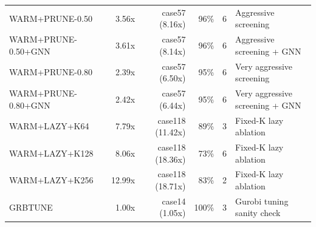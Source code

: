 \begin{table}[t]
{\begin{tabularx}{\linewidth}{|l|r|r|r|r|X|}
WARM+PRUNE-0.50 & 3.56x & case57 (8.16x) & 96\% & 6 & Aggressive screening \\
WARM+PRUNE-0.50+GNN & 3.61x & case57 (8.14x) & 96\% & 6 & Aggressive screening + GNN \\
WARM+PRUNE-0.80 & 2.39x & case57 (6.50x) & 95\% & 6 & Very aggressive screening \\
WARM+PRUNE-0.80+GNN & 2.42x & case57 (6.44x) & 95\% & 6 & Very aggressive screening + GNN \\
WARM+LAZY+K64 & 7.79x & case118 (11.42x) & 89\% & 3 & Fixed-K lazy ablation \\
WARM+LAZY+K128 & 8.06x & case118 (18.36x) & 73\% & 6 & Fixed-K lazy ablation \\
WARM+LAZY+K256 & 12.99x & case118 (18.71x) & 83\% & 2 & Fixed-K lazy ablation \\
GRBTUNE & 1.00x & case14 (1.05x) & 100\% & 3 & Gurobi tuning sanity check \\
\hline
\end{tabularx}
}
\end{table}
